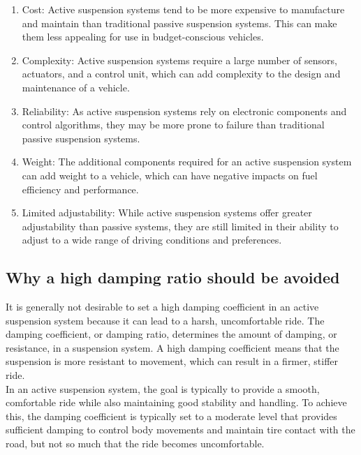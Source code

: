 \documentclass{article}
\begin{document}
\begin{enumerate}
    \item Cost: Active suspension systems tend to be more expensive to manufacture and maintain than traditional passive suspension systems. This can make them less appealing for use in budget-conscious vehicles.

    \item Complexity: Active suspension systems require a large number of sensors, actuators, and a control unit, which can add complexity to the design and maintenance of a vehicle.
    
    \item Reliability: As active suspension systems rely on electronic components and control algorithms, they may be more prone to failure than traditional passive suspension systems.
    
    \item Weight: The additional components required for an active suspension system can add weight to a vehicle, which can have negative impacts on fuel efficiency and performance.
    
    \item Limited adjustability: While active suspension systems offer greater adjustability than passive systems, they are still limited in their ability to adjust to a wide range of driving conditions and preferences.
\end{enumerate}

\subsection{Why a high damping ratio should be avoided}

It is generally not desirable to set a high damping coefficient in an active suspension system 
because it can lead to a harsh, uncomfortable ride. 
The damping coefficient, or damping ratio, 
determines the amount of damping, or resistance, 
in a suspension system. 
A high damping coefficient means that the suspension is more resistant to movement, 
which can result in a firmer, stiffer ride.\\

In an active suspension system, 
the goal is typically to provide a smooth, 
comfortable ride while also maintaining good stability and handling. 
To achieve this, the damping coefficient is typically set to a moderate level 
that provides sufficient damping to control body movements and maintain tire contact with the road, 
but not so much that the ride becomes uncomfortable.\\
\end{document}
